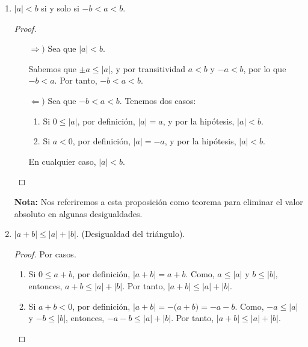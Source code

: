 \documentclass[11pt]{article}
\begin{document}
\begin{enumerate}[label=\alph*)]
\item $|a|<b$ si y solo si $-b<a<b$.

\begin{proof} \leavevmode
 \begin{itemize}
  \item[$\Rightarrow)$] Sea que $|a|<b$.
  
  Sabemos que $\pm a \leq |a|$, y por transitividad $a<b$ y $-a<b$, por lo que $-b<a$. Por tanto, $-b<a<b$.
  \item[$\Leftarrow)$] Sea que $-b<a<b$. Tenemos dos casos: \begin{enumerate}[label=\roman*)]
   \item Si $0\leq |a|$, por definición, $|a|=a$, y por la hipótesis, $|a|<b$.
   \item Si $a<0$, por definición, $|a|=-a$, y por la hipótesis, $|a|<b$.
  \end{enumerate} En cualquier caso, $|a|<b$. \qedhere 
 \end{itemize}
\end{proof}

\textbf{Nota:} Nos referiremos a esta proposición como teorema para eliminar el valor absoluto en algunas desigualdades.

 \item $|a+b|\leq |a|+|b|$. (Desigualdad del triángulo).

 \begin{proof} 
  Por casos.
  \begin{enumerate}[label=\roman*)]
   \item Si $0 \leq a+b$, por definición, $|a+b|=a+b$. Como, $a \leq |a|$ y $b \leq |b|$, entonces, $a+b \leq |a|+|b|$. Por tanto, $|a+b| \leq |a|+|b|$.
   \item Si $a+b<0$, por definición, $|a+b|=-\bigl(a+b\bigr)=-a-b$. Como, $-a \leq |a|$ y $-b \leq |b|$, entonces, $-a-b \leq |a|+|b|$. Por tanto, $|a+b| \leq |a|+|b|$. \qedhere
  \end{enumerate} 
 \end{proof}
%


\end{enumerate}
\end{document}
